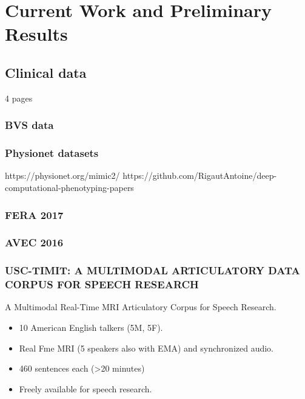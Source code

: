 \chapter{Current Work and Preliminary Results}
\label{cha:currentWork}

\section{Clinical data}

4 pages

\subsection{BVS data}

\subsection{Physionet datasets}


https://physionet.org/mimic2/
https://github.com/RigautAntoine/deep-computational-phenotyping-papers

\subsection{FERA 2017}

\subsection{AVEC 2016}
 
\subsection{USC-TIMIT: A MULTIMODAL ARTICULATORY DATA CORPUS FOR SPEECH RESEARCH}

A Multimodal Real-Time MRI Articulatory Corpus for Speech Research.
\begin{itemize}
    \item 10 American English talkers (5M, 5F).
    \item Real Fme MRI (5 speakers also with EMA)
and synchronized audio.
    \item 460 sentences each (>20 minutes)
    \item Freely available for speech research.
\end{itemize}


